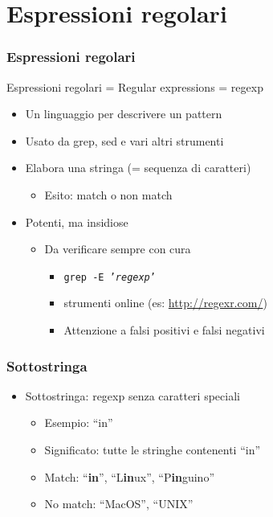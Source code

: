 \documentclass[xetex,table]{beamer}
\begin{document}
\section{Espressioni regolari}

\begin{frame}
  \frametitle{Espressioni regolari}
  Espressioni regolari = Regular expressions = regexp
  \begin{itemize}
  \item Un linguaggio per descrivere un pattern
  \item Usato da grep, sed e vari altri strumenti
  \item Elabora una stringa (= sequenza di caratteri)
    \begin{itemize}
    \item Esito: match o non match
    \end{itemize}
  \item Potenti, ma insidiose
    \begin{itemize}
    \item Da verificare sempre con cura
      \begin{itemize}
      \item \texttt{grep -E '{\em regexp}'}
      \item strumenti online (es: \url{http://regexr.com/})
      \item Attenzione a falsi positivi e falsi negativi
      \end{itemize}
    \end{itemize}
  \end{itemize}
\end{frame}

\begin{frame}
  \frametitle{Sottostringa}
  \begin{itemize}
  \item Sottostringa: regexp senza caratteri speciali
    \begin{itemize}
    \item Esempio: ``in''
    \item Significato: tutte le stringhe contenenti ``in''
    \item Match: ``{\bf in}'', ``L{\bf in}ux'', ``P{\bf in}guino''
    \item No match: ``MacOS'', ``UNIX''
    \end{itemize}
  \end{itemize}
\end{frame}
\end{document}
